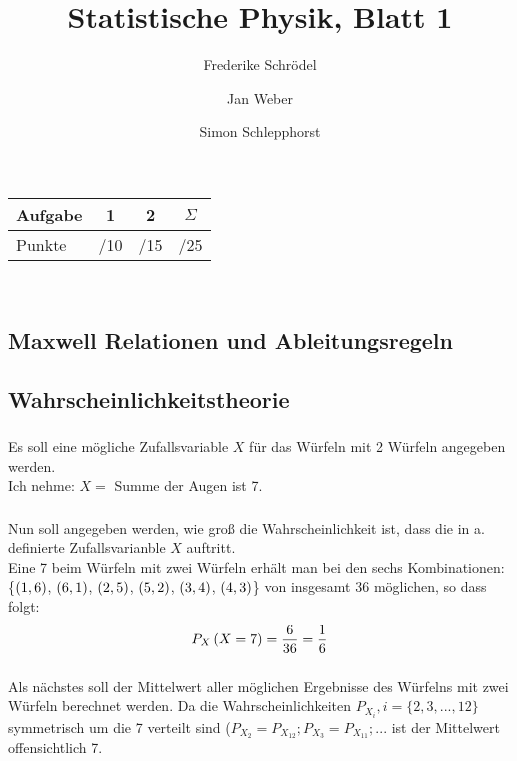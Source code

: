 \documentclass[11pt, ngerman, fleqn, DIV=15, headinclude]{scrartcl}
\title{Statistische Physik, Blatt 1}
\author{
    Frederike Schrödel \and Jan Weber \and Simon Schlepphorst
}
\begin{document}
\maketitle
\begin{center}
	\begin{tabular}{l|c|c|c}
		Aufgabe &1&2&$\Sigma$\\
		\hline
		Punkte &\quad /10 & \quad /15 & \quad /25 
	\end{tabular}\\
\end{center}


\setcounter{section}{1}

\subsection{Maxwell Relationen und Ableitungsregeln}


\subsection{Wahrscheinlichkeitstheorie}

\subsubsection{}
Es soll eine mögliche Zufallsvariable $X$ für das Würfeln mit 2 Würfeln angegeben werden.\\
Ich nehme: $X=$ Summe der Augen ist 7.

\subsubsection{}
Nun soll angegeben werden, wie groß die Wahrscheinlichkeit ist, dass die in a. definierte Zufallsvarianble $X$ auftritt.\\
Eine 7 beim Würfeln mit zwei Würfeln erhält man bei den sechs Kombinationen:
\{$\left( 1,6 \right)$, $\left( 6,1 \right)$, $\left( 2,5 \right)$, $\left( 5,2 \right)$, $\left( 3,4 \right)$, $\left( 4,3 \right)$\} von insgesamt 36 möglichen, so dass folgt:
\begin{align*}
	P_X\left( X=7 \right)=\frac6{36}=\frac16
\end{align*}

\subsubsection{}
Als nächstes soll der Mittelwert aller möglichen Ergebnisse des Würfelns mit zwei Würfeln berechnet werden. Da die Wahrscheinlichkeiten $P_{X_i}, i =\{2,3,...,12\}$ symmetrisch um die 7 verteilt sind ($P_{X_2} = P_{X_{12}}; P_{X_3} = P_{X_{11}}; ...$ ist der Mittelwert offensichtlich 7.
\end{document}
